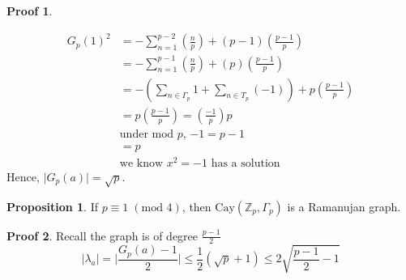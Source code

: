 \documentclass{book}
\newcommand{\Z}{\mathbb{Z}}
\newcommand{\abs}[1]{\lvert #1 \rvert }
\newcommand{\Cay}[1]{\textrm{Cay}( #1 )}
\newcommand{\Mod}[1]{\;(\textrm{mod } #1 )}
\theoremstyle{definition}
\newtheorem{proposition}[lemma]{Proposition}
\theoremstyle{remarkstyle}
\newtheorem*{myproof}{Proof}%
\begin{document}
\begin{myproof}
\begin{itemize}
\begin{align*}
            G_p(1)^2 
            &= -\sum^{p-2}_{n=1}\left(\frac{n}{p}\right) + (p-1)\left(\frac{p-1}{p}\right) \\
            &= -\sum^{p-1}_{n=1}\left(\frac{n}{p}\right) + (p)\left(\frac{p-1}{p}\right) \\
            &= -\left(\sum_{n\in\Gamma_p}1+\sum_{n\in T_p}(-1)\right) + p\left(\frac{p-1}{p}\right) \\
            &= p\left(\frac{p-1}{p}\right) = \left(\frac{-1}{p}\right)p \\
            &\textrm{under mod $p$, $-1=p-1$} \\
            &= p \\
            &\textrm{we know $x^2=-1$ has a solution}
        \end{align*}
        Hence, $\abs{G_p(a)}=\sqrt{p}$. \newline
    \end{itemize}
\end{myproof}

\begin{proposition}
    If $p\equiv 1\Mod{4}$, then $\Cay{\Z_p,\Gamma_p}$ is a Ramanujan graph.
\end{proposition}
\begin{myproof}
Recall the graph is of degree $\frac{p-1}{2}$
    $$
    \abs{\lambda_a}=\abs{\frac{G_p(a)-1}{2}}\le \frac{1}{2}(\sqrt{p}+1)\le 2\sqrt{\frac{p-1}{2}-1}
    $$
\end{myproof}
\end{document}
